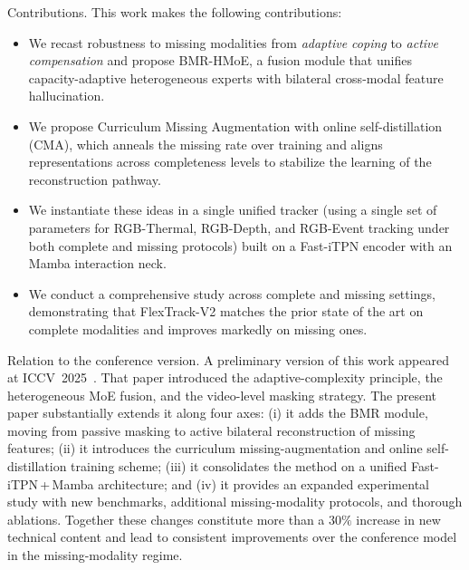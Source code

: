 \medskip
\noindent Contributions. This work makes the following contributions:
\begin{itemize}
  \item We recast robustness to missing modalities from \emph{adaptive coping} to \emph{active compensation} and propose BMR-HMoE, a fusion module that unifies capacity-adaptive heterogeneous experts with bilateral cross-modal feature hallucination.
  \item We propose Curriculum Missing Augmentation with online self-distillation (CMA), which anneals the missing rate over training and aligns representations across completeness levels to stabilize the learning of the reconstruction pathway.
  \item We instantiate these ideas in a single unified tracker (using a single set of parameters for RGB-Thermal, RGB-Depth, and RGB-Event tracking under both complete and missing protocols) built on a Fast-iTPN encoder with an Mamba interaction neck.
  \item We conduct a comprehensive study across complete and missing settings, demonstrating that FlexTrack-V2 matches the prior state of the art on complete modalities and improves markedly on missing ones.
\end{itemize}

\medskip
\noindent Relation to the conference version. A preliminary version of this work appeared at ICCV~2025~\cite{tan2025you}. That paper introduced the adaptive-complexity principle, the heterogeneous MoE fusion, and the video-level masking strategy. The present paper substantially extends it along four axes: (i) it adds the BMR module, moving from passive masking to active bilateral reconstruction of missing features; (ii) it introduces the curriculum missing-augmentation and online self-distillation training scheme; (iii) it consolidates the method on a unified Fast-iTPN\,+\,Mamba architecture; and (iv) it provides an expanded experimental study with new benchmarks, additional missing-modality protocols, and thorough ablations. Together these changes constitute more than a $30\%$ increase in new technical content and lead to consistent improvements over the conference model in the missing-modality regime.
